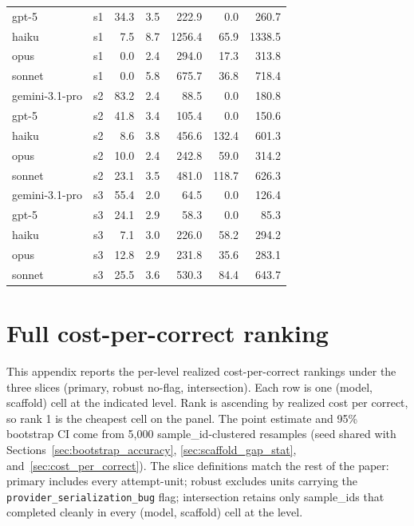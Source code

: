 \documentclass[10pt]{article} %
\begin{document}
\begin{table}[h]
\begin{center}
\begin{tabular}{llrrrrr}
        gpt-5          & s1 & 34.3  & 3.5 & 222.9  & 0.0   & 260.7  \\
        haiku          & s1 & 7.5   & 8.7 & 1256.4 & 65.9  & 1338.5 \\
        opus           & s1 & 0.0   & 2.4 & 294.0  & 17.3  & 313.8  \\
        sonnet         & s1 & 0.0   & 5.8 & 675.7  & 36.8  & 718.4  \\
        gemini-3.1-pro & s2 & 83.2  & 2.4 & 88.5   & 0.0   & 180.8  \\
        gpt-5          & s2 & 41.8  & 3.4 & 105.4  & 0.0   & 150.6  \\
        haiku          & s2 & 8.6   & 3.8 & 456.6  & 132.4 & 601.3  \\
        opus           & s2 & 10.0  & 2.4 & 242.8  & 59.0  & 314.2  \\
        sonnet         & s2 & 23.1  & 3.5 & 481.0  & 118.7 & 626.3  \\
        gemini-3.1-pro & s3 & 55.4  & 2.0 & 64.5   & 0.0   & 126.4  \\
        gpt-5          & s3 & 24.1  & 2.9 & 58.3   & 0.0   & 85.3   \\
        haiku          & s3 & 7.1   & 3.0 & 226.0  & 58.2  & 294.2  \\
        opus           & s3 & 12.8  & 2.9 & 231.8  & 35.6  & 283.1  \\
        sonnet         & s3 & 25.5  & 3.6 & 530.3  & 84.4  & 643.7  \\
    \end{tabular}
    \end{center}
    \end{table}


\section{Full cost-per-correct ranking}\label{app:cost_per_correct_full}

    This appendix reports the per-level realized cost-per-correct rankings under the three slices (primary, robust no-flag, intersection). Each row is one (model, scaffold) cell at the indicated level. Rank is ascending by realized cost per correct, so rank 1 is the cheapest cell on the panel. The point estimate and 95\% bootstrap CI come from 5{,}000 sample\_id-clustered resamples (seed shared with Sections~\ref{sec:bootstrap_accuracy}, \ref{sec:scaffold_gap_stat}, and~\ref{sec:cost_per_correct}). The slice definitions match the rest of the paper: primary includes every attempt-unit; robust excludes units carrying the \texttt{provider\_serialization\_bug} flag; intersection retains only sample\_ids that completed cleanly in every (model, scaffold) cell at the level.
\end{document}
